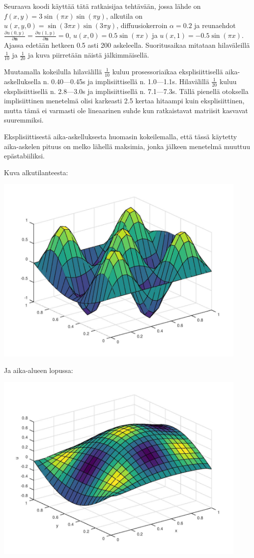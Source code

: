 \documentclass{article}
\begin{document}
Seuraava koodi käyttää tätä ratkaisijaa tehtävään, jossa lähde on $f(x,y) =
3\sin(\pi x)\sin(\pi y)$, alkutila on $u(x,y,0) = \sin(3\pi x)\sin(3\pi y)$,
diffuusiokerroin $\alpha = 0.2$ ja reunaehdot $\frac{\partial u(0,y)}{\partial
\mathbf{n}} = \frac{\partial u(1,y)}{\partial \mathbf{n}} = 0$, $u(x,0) =
0.5\sin(\pi x)$ ja $u(x,1) = -0.5\sin(\pi x)$.  Ajassa edetään hetkeen 0.5 asti
200 askeleella.  Suoritusaikaa mitataan hilaväleillä $\frac{1}{10}$ ja
$\frac{1}{20}$ ja kuva piirretään näistä jälkimmäisellä.



Muutamalla kokeilulla hilavälillä $\frac{1}{10}$ kuluu prosessoriaikaa
eksplisiittisellä aika-askelluksella n. 0.40—0.45s ja implisiittisellä n.
1.0—1.1s.  Hilavälillä $\frac{1}{20}$ kuluu eksplisiittisellä n. 2.8—3.0s ja
implisiittisellä n. 7.1—7.3s.
Tällä pienellä otoksella implisiittinen menetelmä olisi karkeasti 2.5 kertaa hitaampi
kuin eksplisiittinen, mutta tämä ei varmasti ole lineaarinen suhde kun ratkaistavat
matriisit kasvavat suuremmiksi.

Eksplisiittisestä aika-askelluksesta huomasin kokeilemalla, että tässä käytetty
aika-askelen pituus on melko lähellä maksimia, jonka jälkeen menetelmä muuttuu
epästabiiliksi.

Kuva alkutilanteesta:

\includegraphics[width=350pt]{w4_2_start.jpg}

Ja aika-alueen lopussa:

\includegraphics[width=350pt]{w4_2_end.jpg}
\end{document}

